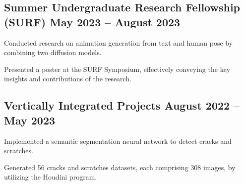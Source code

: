 \subsection{{Summer Undergraduate Research Fellowship (SURF) \hfill May 2023 – August 2023}}
\begin{zitemize}
\item Conducted research on animation generation from text and human pose by combining two diffusion models.
\item Presented a poster at the SURF Symposium, effectively conveying the key insights and contributions of the research.
\end{zitemize}


\subsection{{Vertically Integrated Projects \hfill August 2022 – May 2023}}
\begin{zitemize}
\item Implemented a semantic segmentation neural network to detect cracks and scratches.
\item Generated 56 cracks and scratches datasets, each comprising 308 images, by utilizing the Houdini program.

\end{zitemize}

